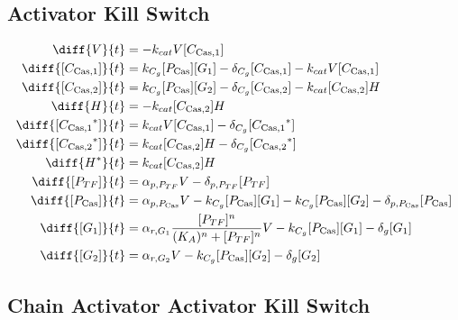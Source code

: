 \subsection{Activator Kill Switch}
\label{s:Activator_Kill_Switch}

\begin{align}
\diff{\vectorGen{}}{t} & = - \casCutRate{{}}\vectorGen{}\conc{\cplx{\cas}{1}}\\
\diff{\conc{\cplx{\cas}{1}}}{t} & =  \gRnaBind{}\conc{\proSp{\cas{}}}\conc{\gRna{1}} - \casCompDegradeRate{}\conc{\cplx{\cas}{1}} - \casCutRate{{}}\vectorGen{}\conc{\cplx{\cas}{1}}\\
\diff{\conc{\cplx{\cas}{2}}}{t} & =  \gRnaBind{}\conc{\proSp{\cas{}}}\conc{\gRna{2}} - \casCompDegradeRate{}\conc{\cplx{\cas}{2}} - \casCutRate{{}}\conc{\cplx{\cas}{2}}\hostGen{}\\
\diff{\hostGen{}}{t} & = - \casCutRate{{}}\conc{\cplx{\cas}{2}}\hostGen{}\\
\diff{\conc{\bound{\cplx{\cas}{1}}}}{t} & =  \casCutRate{{}}\vectorGen{}\conc{\cplx{\cas}{1}} - \casCompDegradeRate{}\conc{\bound{\cplx{\cas}{1}}}\\
\diff{\conc{\bound{\cplx{\cas}{2}}}}{t} & =  \casCutRate{{}}\conc{\cplx{\cas}{2}}\hostGen{} - \casCompDegradeRate{}\conc{\bound{\cplx{\cas}{2}}}\\
\diff{\edited{\hostGen{}}}{t} & =  \casCutRate{{}}\conc{\cplx{\cas}{2}}\hostGen{}\\
\diff{\conc{\proSp{TF}}}{t} & =  \txtlRate{\proSp{TF}}\vectorGen{} - \proDegradeRate{\proSp{TF}}\conc{\proSp{TF}}\\
\diff{\conc{\proSp{\cas{}}}}{t} & =  \txtlRate{\proSp{\cas{}}}\vectorGen{} - \gRnaBind{}\conc{\proSp{\cas{}}}\conc{\gRna{1}} - \gRnaBind{}\conc{\proSp{\cas{}}}\conc{\gRna{2}} - \proDegradeRate{\proSp{\cas{}}}\conc{\proSp{\cas{}}}\\
\diff{\conc{\gRna{1}}}{t} & =  \txRate{\gRna{1}}\frac{\conc{\proSp{TF}}^n}{(K_A)^n + \conc{\proSp{TF}}^n}\vectorGen{} - \gRnaBind{}\conc{\proSp{\cas{}}}\conc{\gRna{1}} - \rnaDegradeRate{}\conc{\gRna{1}}\\
\diff{\conc{\gRna{2}}}{t} & =  \txRate{\gRna{2}}\vectorGen{} - \gRnaBind{}\conc{\proSp{\cas{}}}\conc{\gRna{2}} - \rnaDegradeRate{}\conc{\gRna{2}}
\end{align}

\subsection{Chain Activator Activator Kill Switch}
\label{s:Chain_Activator_Activator_Kill_Switch}

